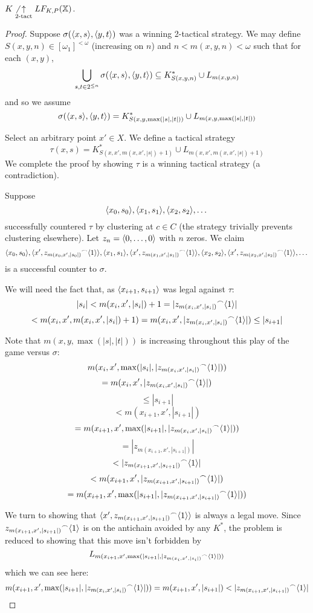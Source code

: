 \begin{theorem}
$K\not\underset{2\text{-tact}}{\uparrow}LF_{K,P}(\mathbb{X})$.
\end{theorem}

\begin{proof}
Suppose $\sigma(\langle x,s\rangle,\langle y,t\rangle)$ was a winning 2-tactical strategy. We may define $S(x,y,n)\in [\omega_1]^{<\omega}$ (increasing on $n$) and $n<m(x,y,n)<\omega$ such that for each $(x,y)$,
  \[
    \bigcup_{s,t \in 2^{\leq n}} \sigma(\langle x,s\rangle,\langle y,t\rangle) \subseteq 
    K^*_{S(x,y,n)} \cup L_{m(x,y,n)}
  \]
and so we assume
  \[
    \sigma(\langle x,s\rangle,\langle y,t\rangle) =
    K^*_{S(x,y,\max(|s|,|t|))} \cup L_{m(x,y,\max(|s|,|t|))}
  \]

Select an arbitrary point $x' \in X$. We define a tactical strategy 
  \[
  \tau(x,s) = 
  K^*_{S(x,x',m(x,x',|s|)+1)} \cup L_{m(x,x',m(x,x',|s|)+1)}
  \]
We complete the proof by showing $\tau$ is a winning tactical strategy (a contradiction).

Suppose
\[
\langle x_0, s_0\rangle, \langle x_1, s_1\rangle, \langle x_2, s_2\rangle, \dots
\]
successfully countered $\tau$ by clustering at $c\in C$ (the strategy trivially prevents clustering elsewhere). Let $z_n = \langle0,\dots,0\rangle$ with $n$ zeros. We claim
\[
\langle x_0, s_0\rangle, \langle x', {z_{m(x_0,x',|s_0|)}}^\frown\langle1\rangle\rangle, \langle x_1, s_1\rangle, \langle x', {z_{m(x_1,x',|s_1|)}}^\frown\langle1\rangle\rangle,  \langle x_2, s_2\rangle, \langle x', {z_{m(x_2,x',|s_2|)}}^\frown\langle1\rangle\rangle, \dots
\]
is a successful counter to $\sigma$.

We will need the fact that, as $\langle x_{i+1},s_{i+1}\rangle$ was legal against $\tau$:
  \[
    |s_i| <
    m(x_i,x',|s_i|)+1 =
    |{z_{m(x_i,x',|s_i|)}}^\frown\langle1\rangle| 
  \]
  \[
    <
    m(x_i,x',m(x_i,x',|s_i|)+1) =
    m(x_i,x',|{z_{m(x_i,x',|s_i|)}}^\frown\langle1\rangle|) \leq
    |s_{i+1}|
  \]

Note that $m(x,y,\max(|s|,|t|))$ is increasing throughout this play of the game versus $\sigma$:
  \[
    m(x_i,x',\max(|s_i|,|{z_{m(x_i,x',|s_i|)}}^\frown\langle1\rangle|))
  \]
  \[
    =
    m(x_i,x',|{z_{m(x_i,x',|s_i|)}}^\frown\langle1\rangle|)
  \]
  \[
    \leq
    |s_{i+1}| 
  \]
  \[
    <
    m(x_{i+1},x',|s_{i+1}|)
  \]
  \[
    =
    m(x_{i+1},x',\max(|s_{i+1}|,|{z_{m(x_i,x',|s_i|)}}^\frown\langle1\rangle|))
  \]
  \[
    =
    |{z_{m(x_{i+1},x',|s_{i+1}|)}}|
  \]
  \[
    <
    |{z_{m(x_{i+1},x',|s_{i+1}|)}}^\frown\langle1\rangle|
  \]
  \[
    <
    m(x_{i+1},x',|{z_{m(x_{i+1},x',|s_{i+1}|)}}^\frown\langle1\rangle|)
  \]
  \[
    =
    m(x_{i+1},x',\max(|s_{i+1}|,|{z_{m(x_{i+1},x',|s_{i+1}|)}}^\frown\langle1\rangle|))
  \]

We turn to showing that $\langle x', {z_{m(x_{i+1},x',|s_{i+1}|)}}^\frown\langle1\rangle\rangle$ is always a legal move. Since ${z_{m(x_{i+1},x',|s_{i+1}|)}}^\frown\langle1\rangle$ is on the antichain avoided by any $K^*$, the problem is reduced to showing that this move isn't forbidden by
  \[
  L_{m(x_{i+1},x',\max(|s_{i+1}|,|{z_{m(x_i,x',|s_i|)}}^\frown\langle1\rangle|))}
  \]
which we can see here:
  \[
    m(x_{i+1},x',\max(|s_{i+1}|,|{z_{m(x_i,x',|s_i|)}}^\frown\langle1\rangle|)) =
    m(x_{i+1},x',|s_{i+1}|) <
    |{z_{m(x_{i+1},x',|s_{i+1}|)}}^\frown\langle1\rangle|
  \]


\end{proof}
